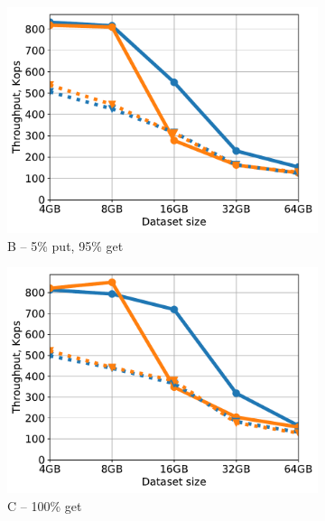 \begin{figure}[tb]
\begin{subfigure}{0.3\linewidth}
\label{fig:throughput:a}
\end{subfigure}
\hspace{0.01\linewidth} 
\begin{subfigure}{0.3\linewidth}
\includegraphics[width=\textwidth]{figs/Workload_B_line.pdf}
\caption{B -- 5\% put, 95\% get}
\label{fig:throughput:b}
\end{subfigure}
\hspace{70pt}
\begin{subfigure}{0.3\linewidth}
\includegraphics[width=\textwidth]{figs/Workload_C_line.pdf}
\caption{C -- 100\% get}
\label{fig:throughput:c}
\end{subfigure}
\begin{subfigure}{0.3\linewidth}

\end{subfigure}
\end{figure}
